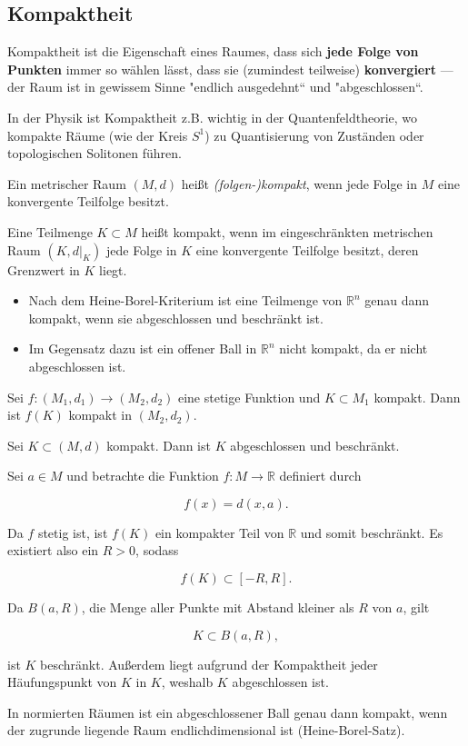 \subsection{Kompaktheit}

Kompaktheit ist die Eigenschaft eines Raumes, dass sich \textbf{jede Folge von Punkten} immer so wählen lässt, dass sie (zumindest teilweise) \textbf{konvergiert} — der Raum ist in gewissem Sinne "endlich ausgedehnt“ und "abgeschlossen“.

In der Physik ist Kompaktheit z.B. wichtig in der Quantenfeldtheorie, wo kompakte Räume (wie der Kreis $S^1$) zu Quantisierung von Zuständen oder topologischen Solitonen führen.


\begin{definition}{}
Ein metrischer Raum $(M,d)$ heißt \emph{(folgen-)kompakt}, wenn jede Folge in $M$ eine konvergente Teilfolge besitzt.
\end{definition}

\begin{definition}{}
Eine Teilmenge $K \subset M$ heißt kompakt, wenn im eingeschränkten metrischen Raum $(K, d|_K)$ jede Folge in $K$ eine konvergente Teilfolge besitzt, deren Grenzwert in $K$ liegt.
\end{definition}

\begin{beispielbox}
\begin{itemize}
  \item Nach dem Heine-Borel-Kriterium ist eine Teilmenge von $\mathbb{R}^n$ genau dann kompakt, wenn sie abgeschlossen und beschränkt ist.
  \item Im Gegensatz dazu ist ein offener Ball in $\mathbb{R}^n$ nicht kompakt, da er nicht abgeschlossen ist.
\end{itemize}
\end{beispielbox}

\begin{satz}{}
    Sei $f: (M_1,d_1) \to (M_2,d_2)$ eine stetige Funktion und $K \subset M_1$ kompakt. Dann ist $f(K)$ kompakt in $(M_2,d_2)$.
\end{satz}


\begin{satz}{}
    Sei $K \subset (M,d)$ kompakt. Dann ist $K$ abgeschlossen und beschränkt.
\end{satz}

\begin{beweisbox}
Sei $a \in M$ und betrachte die Funktion $f: M \to \mathbb{R}$ definiert durch


$$
f(x) = d(x,a).
$$


Da $f$ stetig ist, ist $f(K)$ ein kompakter Teil von $\mathbb{R}$ und somit beschränkt. Es existiert also ein $R > 0$, sodass


$$
f(K) \subset [-R, R].
$$


Da $B(a, R)$, die Menge aller Punkte mit Abstand kleiner als $R$ von $a$, gilt


$$
K \subset B(a,R),
$$


ist $K$ beschränkt. Außerdem liegt aufgrund der Kompaktheit jeder Häufungspunkt von $K$ in $K$, weshalb $K$ abgeschlossen ist.
\end{beweisbox}

\begin{bemerkungbox}
In normierten Räumen ist ein abgeschlossener Ball genau dann kompakt, wenn der zugrunde liegende Raum endlichdimensional ist (Heine-Borel-Satz).
\end{bemerkungbox}
